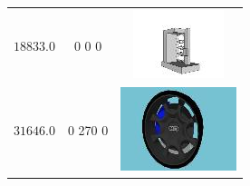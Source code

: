 \begin{longtable}{ccc}
	$18833.0$ & 0 0 0 & \includegraphics{models/77429d8f0e71f132ab643078ae14a449.jpg}\\
	$31646.0$ & 0 270 0 & \includegraphics{models/683f7d4cb776505e5d3a87a5c4dd9ce4.jpg}\\
\end{longtable}